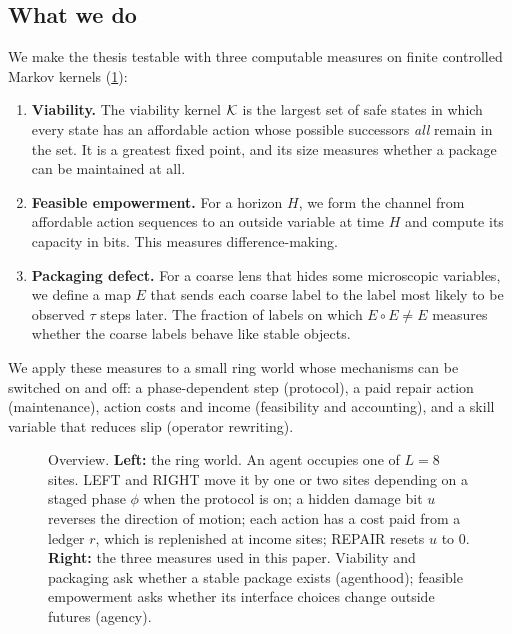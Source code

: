 \subsection{What we do}
We make the thesis testable with three computable measures on finite controlled Markov kernels (\cref{fig:overview}):
\begin{enumerate}[leftmargin=*, itemsep=0.25em]
  \item \textbf{Viability.} The viability kernel $\mathcal{K}$ is the largest set of safe states in which every state has an affordable action whose possible successors \emph{all} remain in the set. It is a greatest fixed point, and its size measures whether a package can be maintained at all.
  \item \textbf{Feasible empowerment.} For a horizon $H$, we form the channel from affordable action sequences to an outside variable at time $H$ and compute its capacity in bits. This measures difference-making.
  \item \textbf{Packaging defect.} For a coarse lens that hides some microscopic variables, we define a map $E$ that sends each coarse label to the label most likely to be observed $\tau$ steps later. The fraction of labels on which $E\circ E\neq E$ measures whether the coarse labels behave like stable objects.
\end{enumerate}
We apply these measures to a small ring world whose mechanisms can be switched on and off: a phase-dependent step (protocol), a paid repair action (maintenance), action costs and income (feasibility and accounting), and a skill variable that reduces slip (operator rewriting).

\begin{figure}[t]
\centering

\caption{Overview. \textbf{Left:} the ring world. An agent occupies one of $L=8$ sites. LEFT and RIGHT move it by one or two sites depending on a staged phase $\phi$ when the protocol is on; a hidden damage bit $u$ reverses the direction of motion; each action has a cost paid from a ledger $r$, which is replenished at income sites; REPAIR resets $u$ to $0$. \textbf{Right:} the three measures used in this paper. Viability and packaging ask whether a stable package exists (agenthood); feasible empowerment asks whether its interface choices change outside futures (agency).}
\label{fig:overview}
\end{figure}

